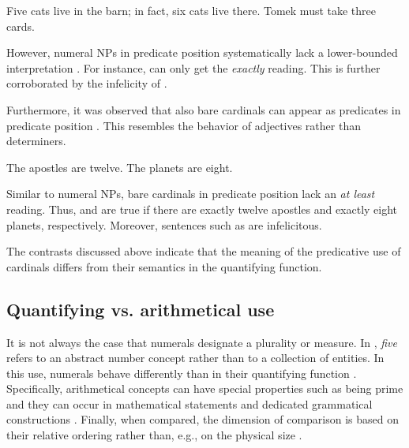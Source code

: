 \documentclass[output=paper]{langscibook}
\begin{document}
\ea\label{ex:at-least-quantifying} \ea Five cats live in the barn; in fact, six cats live there.\label{ex:at-least-quantifying-in-fact}
\ex Tomek must take three cards.\label{ex:at-least-quantifying-must}
\z
\z

\noindent However, numeral NPs in predicate position systematically lack a lower-bounded interpretation \citep{partee87,landman2003predicate,geurts2006take}. For instance,  can only get the \textit{exactly} reading. This is further corroborated by the infelicity of . 

\ea {}\label{ex:at-least-predicative} 
\label{ex:at-least-predicative-in-fact}
\z
\z

\noindent Furthermore, it was observed that also bare cardinals can appear as predicates in predicate position  \citep{rothstein2017semantics}. This resembles the behavior of adjectives rather than determiners.

\ea\label{ex:bare-predicative} \ea The apostles are twelve.\label{ex:bare-predicative-apostles}
\ex The planets are eight.\label{ex:bare-predicative-planets}
\z
\z

\noindent Similar to numeral NPs, bare cardinals in predicate position lack an \textit{at least} reading. Thus,  and  are true if there are exactly twelve apostles and exactly eight planets, respectively. Moreover, sentences such as  are infelicitous.

\label{ex:bare-predicative-in-fact}
\z

\noindent The contrasts discussed above indicate that the meaning of the predicative use of cardinals differs from their semantics in the quantifying function.   

\subsection{Quantifying vs. arithmetical use}\label{sec:quantifying-vs-arithmetical-use}
\largerpage

It is not always the case that numerals designate a plurality or measure. In , \textit{five} refers to an abstract number concept rather than to a collection of entities. In this use, numerals behave differently than in their quantifying function \citep{bultinck2005numerous,rothstein2017semantics,wagiel_caha2020universal}. Specifically, arithmetical concepts can have special properties such as being prime  and they can occur in mathematical statements  and dedicated grammatical constructions . Finally, when compared, the dimension of comparison is based on their relative ordering rather than, e.g., on the physical size . 
\end{document}
